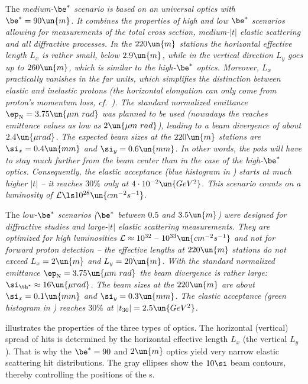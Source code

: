 \> The \em{medium-$\be^*$} scenario is based on an universal optics with $\be^* = 90\un{m}$. It combines the properties of high and low $\be^*$ scenarios allowing for measurements of the total cross section, medium-$|t|$ elastic scattering and all diffractive processes. In the $220\un{m}$ stations the horizontal effective length $L_x$ is rather small, below $2.9\un{m}$, while in the vertical direction $L_y$ goes up to $260\un{m}$, which is similar to the high-$\be^*$ optics. Moreover, $L_x$ practically vanishes in the far units, which simplifies the distinction between elastic and inelastic protons (the horizontal elongation can only come from proton's momentum loss, cf.~). The standard normalized emittance $\ep_{\rm N} = 3.75\un{\mu m\ rad}$ was planned to be used (nowadays the  reaches emittance values as low as $2\un{\mu m\ rad}$), leading to a beam divergence of about $2.4\un{\mu rad}$. The expected beam sizes at the $220\un{m}$ stations are $\si_x = 0.4\un{mm}$ and $\si_y = 0.6\un{mm}$. In other words, the pots will have to stay much further from the beam center than in the case of the high-$\be^*$ optics. Consequently, the elastic acceptance (blue histogram in ) starts at much higher $|t|$ -- it reaches $30\percent$ only at $4\cdot 10^{-2}\un{GeV^2}$. This scenario counts on a luminosity of ${\cal L} \ls 10^{28} \un{cm^{-2}s^{-1}}$.

\> The \em{low-$\be^*$} scenarios ($\be^*$ between $0.5$ and $3.5\un{m}$) were designed for diffractive studies and large-$|t|$ elastic scattering measurements. They are optimized for high luminosities ${\cal L} \approx 10^{32} \hbox{ -- } 10^{33}\un{cm^{-2}s^{-1}}$ and not for forward proton detection -- the effective lengths at $220\un{m}$ stations do not exceed $L_x = 2\un{m}$ and $L_y = 20\un{m}$. With the standard normalized emittance $\ep_{\rm N} = 3.75\un{\mu m\ rad}$ the beam divergence is rather large: $\si_{\th^*} \approx 16\un{\mu rad}$. The beam sizes at the $220\un{m}$ are about $\si_x = 0.1\un{mm}$ and $\si_y = 0.3\un{mm}$. The elastic acceptance (green histogram in ) reaches $30\percent$ at $|t_{30}| = 2.5\un{GeV^2}$.


 illustrates the properties of the three types of optics. The horizontal (vertical) spread of hits is determined by the horizontal effective length $L_x$ (the vertical $L_y$). That is why the $\be^* = 90$ and $2\un{m}$ optics yield very narrow elastic scattering hit distributions. The gray ellipses show the $10\si$ beam contours, thereby controlling the positions of the s.




